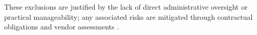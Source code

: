 These exclusions are justified by the lack of direct administrative oversight or
practical manageability; any associated risks are mitigated through contractual
obligations and vendor assessments \cite{advisera}.












